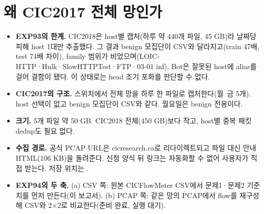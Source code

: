 
\usepackage{tabularx}


\section{왜 CIC2017 전체 망인가}
\begin{itemize}
\item \textbf{EXP93의 한계.} CIC2018은 host별 캡처(하루 약 440개 파일, 45 GB)라 날짜당 피해 host 1대만 추출했다. 그 결과 benign 모집단이 CSV와 달라지고(train 47배, test 74배 차이), family 범위가 비었으며(LOIC-HTTP·Hulk·SlowHTTPTest·FTP·03-01 inf), Bot은 잘못된 host에 alias를 걸어 결함이 됐다. 이 상태로는 head 조기 포화를 판단할 수 없다.
\item \textbf{CIC2017의 구조.} 스위치에서 전체 망을 하루 한 파일로 캡처한다(월~금 5개). host 선택이 없고 benign 모집단이 CSV와 같다. 월요일은 benign 전용이다.
\item \textbf{크기.} 5개 파일 약 50 GB. CIC2018 전체(450 GB)보다 작고, host별 중복 패킷 dedup도 필요 없다.
\item \textbf{수집 경로.} 공식 PCAP URL은 cicresearch.ca로 리다이렉트되고 파일 대신 안내 HTML(106 KB)을 돌려준다. 신청 양식 뒤 링크는 자동화할 수 없어 사용자가 직접 받는다. 저장 위치는 .
\item \textbf{EXP94의 두 축.} (a) CSV 쪽: 원본 CICFlowMeter CSV에서 문제1·문제2 기준치를 먼저 만든다(이 보고서). (b) PCAP 쪽: 같은 망의 PCAP에서 flow를 재구성해 CSV와 2$\times$2로 비교한다(준비 완료, 실행 대기).
\end{itemize}

